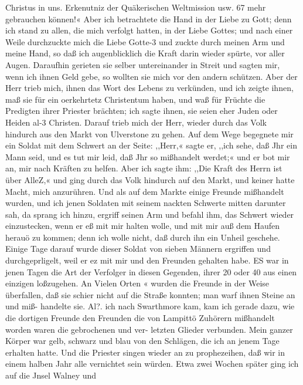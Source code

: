 Christus in uns. Erkenutniz der Quäkerischen Weltmission usw. 67
mehr gebrauchen können!« Aber ich betrachtete die Hand in der
Liebe zu Gott; denn ich stand zu allen, die mich verfolgt hatten,
in der Liebe Gottes; und nach einer Weile durchzuckte mich die
Liebe Gotte-3 und zuckte durch meinen Arm und meine Hand,
so daß ich augenblicklich die Kraft darin wieder spürte, vor aller
Augen. Daraufhin gerieten sie selber untereinander in Streit und
sagten mir, wenn ich ihnen Geld gebe, so wollten sie mich vor
den andern schützen. Aber der Herr trieb mich, ihnen das Wort
des Lebens zu verkünden, und ich zeigte ihnen, maß sie für ein
oerkehrtetz Christentum haben, und waß für Früchte die Predigten
ihrer Priester brächten; ich sagte ihnen, sie seien eher Juden oder
Heiden al-3 Christen. Darauf trieb mich der Herr, wieder durch
das Volk hindurch aus den Markt von Ulverstone zu gehen. Auf
dem Wege begegnete mir ein Soldat mit dem Schwert an der
Seite: ,,Herr,« sagte er, ,,ich sehe, daß Jhr ein Mann seid, und
es tut mir leid, daß Jhr so mißhandelt werdet;« und er bot mir
an, mir nach Kräften zu helfen. Aber ich sagte ihm: ,,Die Kraft
des Herrn ist über AlleZ,« und ging durch das Volk hindurch auf
den Markt, und keiner hatte Macht, mich anzurühren. Und als
auf dem Markte einige Freunde mißhandelt wurden, und ich jenen
Soldaten mit seinem nackten Schwerte mitten darunter sah, da
sprang ich hinzu, ergriff seinen Arm und befahl ihm, das Schwert
wieder einzustecken, wenn er eß mit mir halten wolle, und mit
mir auß dem Haufen herauö zu kommen; denn ich wolle nicht,
daß durch ihn ein Unheil geschehe. Einige Tage darauf wurde
dieser Soldat von sieben Männern ergriffen und durchgeprligelt,
weil er ez mit mir und den Freunden gehalten habe. ES war
in jenen Tagen die Art der Verfolger in diesen Gegenden,
ihrer 20 oder 40 aus einen einzigen loßzugehen. An Vielen Orten «
wurden die Freunde in der Weise überfallen, daß sie schier nicht
auf die Straße konnten; man warf ihnen Steine an und miß-
handelte sie. Al?. ich nach Swarthmore kam, kam ich gerade
dazu, wie die dortigen Freunde den Freunden die von Lampittö
Zuhörern mißhandelt worden waren die gebrochenen und ver-
letzten Glieder verbunden. Mein ganzer Körper war gelb, schwarz
und blau von den Schlägen, die ich an jenem Tage erhalten
hatte. Und die Priester singen wieder an zu prophezeihen, daß
wir in einem halben Jahr alle vernichtet sein würden.
Etwa zwei Wochen später ging ich auf die Jnsel Walney und
 


